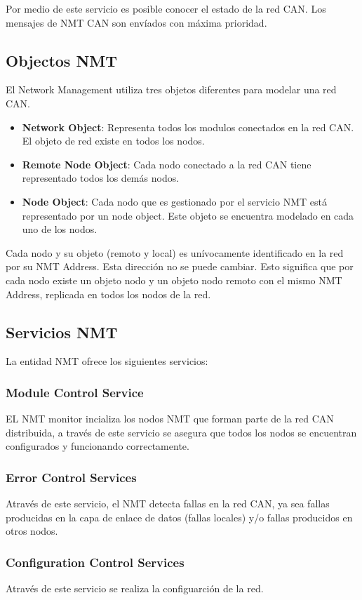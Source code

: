 Por medio de este servicio es posible conocer el estado de la red CAN. Los
mensajes de NMT CAN son envíados con máxima prioridad. 
\subsection{Objectos NMT}
El Network Management utiliza tres objetos diferentes para modelar una red CAN.
\begin{itemize}
 \item \textbf{Network Object}: Representa todos los modulos conectados en la
  red CAN. El objeto de red existe en todos los nodos.
 \item \textbf{Remote Node Object}: Cada nodo conectado a la red CAN tiene
   representado todos los demás nodos.    
 \item \textbf{Node Object}: Cada nodo que es gestionado por el servicio NMT
   está representado por un node object. Este objeto se encuentra modelado en
   cada uno de los nodos.    
 \end{itemize}
Cada nodo y su objeto (remoto y local) es unívocamente identificado en la red
por su NMT Address. Esta dirección no se puede cambiar. Esto significa que por
cada nodo existe un objeto nodo y un objeto nodo remoto con el mismo NMT
Address, replicada en todos los nodos de la red. 

\subsection{Servicios NMT}
La entidad NMT ofrece los siguientes servicios:
\subsubsection{Module Control Service}
EL NMT monitor incializa los nodos NMT que forman parte de la red CAN
distribuida, a través de este servicio se asegura que todos los nodos se
encuentran configurados y funcionando correctamente.
\subsubsection{Error Control Services}
Através de este servicio, el NMT detecta fallas en la red CAN, ya sea fallas
producidas en la capa de enlace de datos (fallas locales) y/o fallas
producidos en otros nodos.
\subsubsection{Configuration Control Services}
Através de este servicio se realiza la configuarción de la red.

